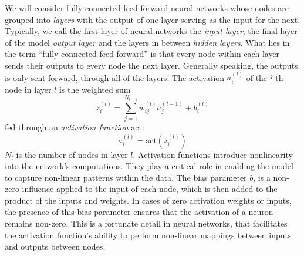 \documentclass[a4paper, UKenglish, 11pt]{uiomaster}
\begin{document}
We will consider fully connected feed-forward neural networks whose nodes are grouped into \emph{layers} with the output of one layer serving as the input for the next. Typically, we call the first layer of neural networks the \emph{input layer}, the final layer of the model \emph{output layer} and the layers in between \emph{hidden layers}. What lies in the term ``fully connected feed-forward'' is that every node within each layer sends their outputs to every node the next layer. Generally speaking, the outputs is only sent forward, through all of the layers.  The activation $a_i^{(l)}$ of the $i$-th node in layer $l$ is the weighted sum
\begin{equation}
  z_i^{(l)} = \sum_{j=1}^{N_{l-1}} w_{ij}^{(l)} a_{j}^{(l-1)} + b_i^{(l)}
  \label{activation_node}
\end{equation}
fed through an \emph{activation function} \(\text{act}\):
\begin{equation}
  a_i^{(l)} = \text{act} \left( z_i^{(l)} \right)
\end{equation}
$N_{l}$ is the number of nodes in layer \(l\).
Activation functions introduce nonlinearity into the network's computations. They play a critical role in enabling the model to capture non-linear patterns within the data. The bias parameter $b$, is a non-zero influence applied to the input of each node, which is then added to the product of the inputs and weights. In cases of zero activation weights or inputs, the presence of this bias parameter ensures that the activation of a neuron remains non-zero. This is a fortunate detail in neural networks, that facilitates the activation function's ability to perform non-linear mappings between inputs and outputs between nodes.



\end{document}
